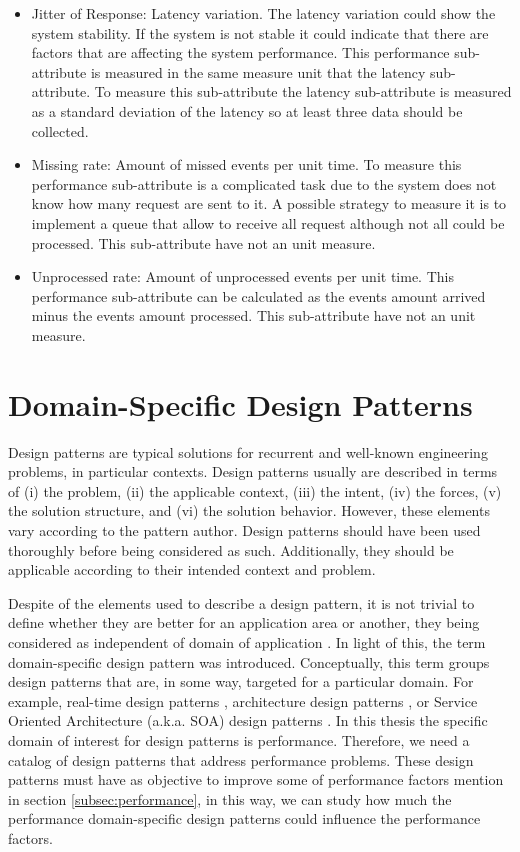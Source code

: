 \begin{itemize}
	\item Jitter of Response: Latency variation. The latency variation could show the system stability. If the system is not stable it could indicate that there are factors that are affecting the system performance. This performance sub-attribute is measured in the same measure unit that the latency sub-attribute. To measure this sub-attribute the latency sub-attribute is measured as a standard deviation of the latency so at least three data should be collected.
	\item Missing rate: Amount of missed events per unit time. To measure this performance sub-attribute is a complicated task due to the system does not know how many request are sent to it. A possible strategy to measure it is to implement a queue that allow to receive all request although not all could be processed. This sub-attribute have not an unit measure.
	\item Unprocessed rate: Amount of unprocessed events per unit time. This performance sub-attribute can be calculated as the events amount arrived minus the events amount processed. This sub-attribute have not an unit measure.
\end{itemize}

\section {Domain-Specific Design Patterns}
Design patterns are typical solutions for recurrent and well-known engineering problems, in particular contexts. Design patterns usually are described in terms of (i) the problem, (ii) the applicable context, (iii) the intent, (iv) the forces, (v) the solution structure, and (vi) the solution behavior. However, these elements vary according to the pattern author. Design patterns should have been used thoroughly before being considered as such. Additionally, they should be applicable according to their intended context and problem. 

Despite of the elements used to describe a design pattern, it is not trivial to define whether they are better for an application area or another, they being considered as independent of domain of application \cite{gustavsson2002domain}. In light of this, the term domain-specific design pattern was introduced. Conceptually, this term groups design patterns that are, in some way, targeted for a particular domain. For example, real-time design patterns \cite{douglass2003real}, architecture design patterns \cite{kuchana2004software}, or Service Oriented Architecture (a.k.a. SOA) design patterns \cite{erl2008soa}. In this thesis the specific domain of interest for design patterns is performance. Therefore, we need a catalog of design patterns that address performance problems. These design patterns must have as objective to improve some of performance factors mention in section \ref{subsec:performance}, in this way, we can study how much the performance domain-specific design patterns could influence the performance factors. 

